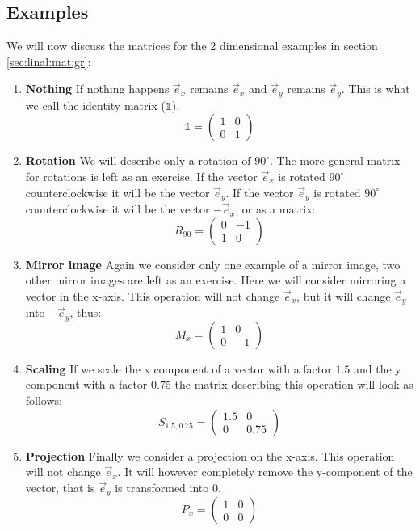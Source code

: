 \documentclass[a4paper]{report}
\begin{document}
\subsection{Examples}
We will now discuss the matrices for the 2 dimensional examples in section \ref{sec:linal:mat:gr}:
\begin{enumerate}
\item \textbf{Nothing} If nothing happens $\vec{e}_x$ remains $\vec{e}_x$ and $\vec{e}_y$ remains $\vec{e}_y$. This is what we call the identity matrix ($\mathbb{1}$).
\begin{equation*}
\mathbb{1} = \begin{pmatrix} 1 & 0 \\ 0 & 1 \end{pmatrix}
\end{equation*}
\item \textbf{Rotation}  We will describe only a rotation of $90^\circ$. The more general matrix for rotations is left as an exercise. If the vector $\vec{e}_x$ is rotated $90^\circ$ counterclockwise it will be the vector $\vec{e}_y$. If the vector $\vec{e}_y$ is rotated $90^\circ$ counterclockwise it will be the vector $-\vec{e}_x$, or as a matrix:
\begin{equation*}
R_{90}= \begin{pmatrix} 0 & -1\\ 1 & 0 \end{pmatrix}
\end{equation*}
\item \textbf{Mirror image} Again we consider only one example of a mirror image, two other mirror images are left as an exercise. Here we will consider mirroring a vector in the x-axis. This operation will not change $\vec{e}_x$, but it will change $\vec{e}_y$ into $-\vec{e}_y$, thus:
\begin{equation*}
M_x = \begin{pmatrix} 1 & 0 \\ 0 & -1 \end{pmatrix}
\end{equation*}
\item \textbf{Scaling} If we scale the x component of a vector with a factor $1.5$ and the y component with a factor $0.75$ the matrix describing this operation will look as follows:
\begin{equation*}
S_{1.5,0.75} = 
\begin{pmatrix}
1.5 & 0 \\ 0 & 0.75
\end{pmatrix}
\end{equation*}
\item \textbf{Projection} Finally we consider a projection on the x-axis. This operation will not change $\vec{e}_x$. It will however completely remove the y-component of the vector, that is $\vec{e}_y$ is transformed into 0.
\begin{equation*}
P_x = \begin{pmatrix} 1 & 0\\ 0 & 0 \end{pmatrix}
\end{equation*}
\end{enumerate}
\end{document}
